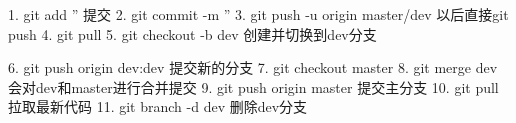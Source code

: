 1. git add ''   提交
2. git commit -m ''  
3. git push -u origin master/dev  以后直接git push
4. git pull
5. git checkout -b dev  创建并切换到dev分支

6. git push origin dev:dev  提交新的分支
7. git checkout master
8. git merge dev   会对dev和master进行合并提交
9. git push origin master   提交主分支
10. git pull   拉取最新代码
11. git branch -d dev   删除dev分支